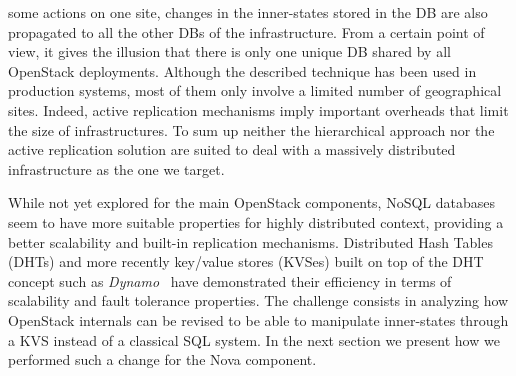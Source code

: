some actions on one site, changes in the inner-states stored in the DB are also propagated to all the other DBs of the infrastructure. From a certain
point of view, it gives the illusion that there is only one unique DB shared by all OpenStack deployments. Although the described technique has been
used in production systems, most of them only involve a limited number of geographical sites. Indeed, active replication mechanisms imply important
overheads that limit the size of infrastructures.
To sum up neither the hierarchical approach nor the active replication solution are suited to deal with a massively distributed infrastructure as the
one we target.

While not yet explored for the main OpenStack components, NoSQL databases seem to have more suitable properties for highly distributed context,
providing a better scalability and built-in replication mechanisms. Distributed Hash Tables (DHTs) and more recently key/value stores (KVSes) built on
top of the DHT concept such as \emph{Dynamo}~\cite{decandia:dynamo} have demonstrated their efficiency in terms of scalability and fault tolerance
properties. The challenge consists in analyzing how OpenStack internals can be revised to be able to manipulate inner-states through a KVS instead of
a classical SQL system. In the next section we present how we performed such a change for the Nova component.




